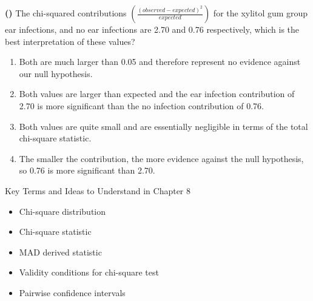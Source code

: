 \documentclass[13pt]{beamer}
\newcounter{count}
\newcommand{\question}{ \textbf{(\decimal{count})} \stepcounter{count}}
\newenvironment{click}{\begin{enumerate}[A]}{\end{enumerate}}
\begin{document}
\begin{frame}
\question The chi-squared contributions $\left ( \frac{(observed - expected)^2}{expected} \right)$ for the xylitol gum group ear infections, and no ear infections are 2.70 and 0.76 respectively, which is the best interpretation of these values?
\begin{click}
   \item Both are much larger than 0.05 and therefore represent no evidence against our null hypothesis.
   \item Both values are larger than expected and the ear infection contribution of 2.70 is more significant than the no infection contribution of 0.76.%
   \item Both values are quite small and are essentially negligible in terms of the total chi-square statistic.
   \item The smaller the contribution, the more evidence against the null hypothesis, so 0.76 is more significant than 2.70.
\end{click}
\end{frame}


\begin{frame}{Key Terms and Ideas to Understand in Chapter 8 }
\begin{itemize}
	\item Chi-square distribution
    \item Chi-square statistic
    \item MAD derived statistic
    \item Validity conditions for chi-square test
    \item Pairwise confidence intervals
\end{itemize}
\end{frame}
\end{document}
